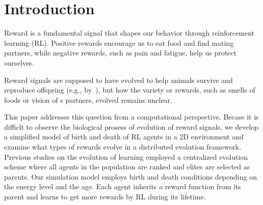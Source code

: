 \section{Introduction}\label{sec:intro}
Reward is a fundamental signal that shapes our behavior through reinforcement learning (RL). 
Positive rewards encourage us to eat food and find mating partners, while negative rewards, such as pain and fatigue, help us protect ourselves. 

Reward signals are supposed to have evolved to help animals survive and reproduce offspring (e.g., by~\cite{schultzNeuronalRewardDecision2015}), but how the variety or rewards, such as smells of foods or vision of s partners, evolved remains unclear.

This paper addresses this question from a computational perspective. 
Becase it is difficlt to observe the biological prosess of evolution of reward signals, we develop a simplified model of birth and death of RL agents in a 2D environment and examine what types of rewards evolve in a
distributed evolution framework.
Previous studies on the evolution of learning \citep{hintonHowLearningCan1987,singhWhereRewardsCome2009} employed a centralized evolution scheme where all agents in the population are ranked and elites are selected as parents.
Our simulation model employs birth and death conditions depending on the energy level and the age. Each agent inherits a reward function from its parent and learns to get more rewards by RL during its lifetime. %

